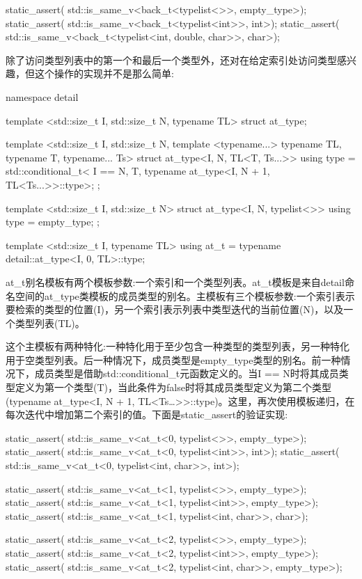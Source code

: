 \begin{cpp}
static_assert(
	std::is_same_v<back_t<typelist<>>, empty_type>);
static_assert(
	std::is_same_v<back_t<typelist<int>>, int>);
static_assert(
	std::is_same_v<back_t<typelist<int, double, char>>,
				   char>);
\end{cpp}

除了访问类型列表中的第一个和最后一个类型外，还对在给定索引处访问类型感兴趣，但这个操作的实现并不是那么简单:

\begin{cpp}
namespace detail
{
	template <std::size_t I, std::size_t N, typename TL>
	struct at_type;
	
	template <std::size_t I, std::size_t N,
			  template <typename...> typename TL,
			  typename T, typename... Ts>
	struct at_type<I, N, TL<T, Ts...>>
	{
		using type =
		std::conditional_t<
		I == N,
		T,
		typename at_type<I, N + 1, TL<Ts...>>::type>;
	};

	template <std::size_t I, std::size_t N>
	struct at_type<I, N, typelist<>>
	{
		using type = empty_type;
	};
}

template <std::size_t I, typename TL>
using at_t = typename detail::at_type<I, 0, TL>::type;
\end{cpp}

at\_t别名模板有两个模板参数:一个索引和一个类型列表。at\_t模板是来自detail命名空间的at\_type类模板的成员类型的别名。主模板有三个模板参数:一个索引表示要检索的类型的位置(I)，另一个索引表示列表中类型迭代的当前位置(N)，以及一个类型列表(TL)。

这个主模板有两种特化:一种特化用于至少包含一种类型的类型列表，另一种特化用于空类型列表。后一种情况下，成员类型是empty\_type类型的别名。前一种情况下，成员类型是借助std::conditional\_t元函数定义的。当I == N时将其成员类型定义为第一个类型(T)，当此条件为false时将其成员类型定义为第二个类型(typename at\_type<I, N + 1, TL<Ts…>{}>::type)。这里，再次使用模板递归，在每次迭代中增加第二个索引的值。下面是static\_assert的验证实现:

\begin{cpp}
static_assert(
	std::is_same_v<at_t<0, typelist<>>, empty_type>);
static_assert(
	std::is_same_v<at_t<0, typelist<int>>, int>);
static_assert(
	std::is_same_v<at_t<0, typelist<int, char>>, int>);
	
static_assert(
	std::is_same_v<at_t<1, typelist<>>, empty_type>);
static_assert(
	std::is_same_v<at_t<1, typelist<int>>, empty_type>);
static_assert(
	std::is_same_v<at_t<1, typelist<int, char>>, char>);
	
static_assert(
	std::is_same_v<at_t<2, typelist<>>, empty_type>);
static_assert(
	std::is_same_v<at_t<2, typelist<int>>, empty_type>);
static_assert(
	std::is_same_v<at_t<2, typelist<int, char>>,
				   empty_type>);
\end{cpp}

